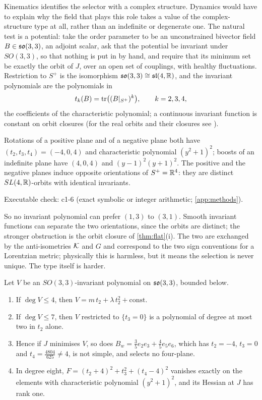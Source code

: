 Kinematics identifies the selector with a complex structure. Dynamics would have to explain why the field that plays this role takes a value of the
complex-structure type at all, rather than an indefinite or degenerate one. The natural test is a potential: take the order parameter to be an unconstrained bivector field
$B\in\mathfrak{so}(3,3)$, an adjoint scalar, ask that the potential be invariant under $SO(3,3)$, so that nothing is put in by hand, and require that its minimum set be exactly the orbit of $J$,
over an open set of couplings, with healthy fluctuations. Restriction to $S^+$ is the isomorphism $\mathfrak{so}(3,3)\cong\mathfrak{sl}(4,\mathbb{R})$, and the invariant polynomials are the
polynomials in
\[
t_k(B)=\operatorname{tr}\bigl((B|_{S^+})^k\bigr),\qquad k=2,3,4,
\]
the coefficients of the characteristic polynomial; a continuous invariant function is constant on orbit closures (for the real orbits and their closures
see \cite{RichardsonSlodowy90,Jablonski12}).

\begin{proposition}
\label{prop:types}
Rotations of a positive plane and of a negative plane both have $(t_2,t_3,t_4)=(-4,0,4)$ and characteristic polynomial $(y^2+1)^2$; boosts of an indefinite plane have
$(4,0,4)$ and $(y-1)^2(y+1)^2$. The positive and the negative planes induce opposite orientations of $S^+=\mathbb{R}^4$: they are distinct $SL(4,\mathbb{R})$-orbits with identical
invariants.
\end{proposition}

\noindent Executable check: c1-6 (exact symbolic or integer arithmetic; \cref{app:methods}).

So no invariant polynomial can prefer $(1,3)$ to $(3,1)$. Smooth invariant functions can separate the two orientations, since the orbits
are distinct; the stronger obstruction is the orbit closure of \cref{thm:flat}(i). The two are exchanged by the anti-isometries $\mathcal K$ and $G$ and correspond to the two sign conventions for a
Lorentzian metric; physically this is harmless, but it means the selection is never unique. The type itself is harder.

\begin{theorem}
\label{thm:degree}
Let $V$ be an $SO(3,3)$-invariant polynomial on $\mathfrak{so}(3,3)$, bounded below.
\begin{enumerate}[label=(\roman*),leftmargin=2.2em]
\item If $\deg V\le4$, then $V=m\,t_2+\lambda\,t_2^2+\mathrm{const}$.
\item If $\deg V\le7$, then $V$ restricted to $\{t_3=0\}$ is a polynomial of degree at most two in $t_2$ alone.
\item Hence if $J$ minimises $V$, so does $B_w=\tfrac35e_2e_3+\tfrac45e_5e_6$, which has $t_2=-4$, $t_3=0$ and $t_4=\tfrac{4804}{625}\neq4$, is not simple, and selects no four-plane.
\item In degree eight, $F=(t_2+4)^2+t_3^2+(t_4-4)^2$ vanishes exactly on the elements with characteristic polynomial $(y^2+1)^2$, and its Hessian at $J$ has rank one.
\end{enumerate}
\end{theorem}

